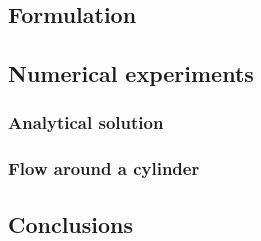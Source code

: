 \documentclass[compress,11 pt,t]{beamer}
\begin{document}
\subsection{Formulation}


\subsection{Numerical experiments}


\subsubsection{Analytical solution}


\subsubsection{Flow around a cylinder}


\subsection{Conclusions}


\end{document}
